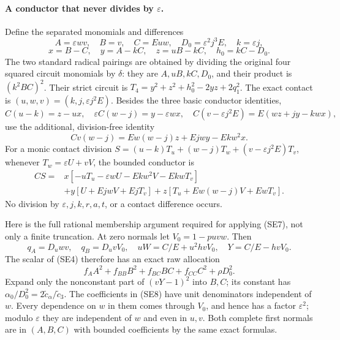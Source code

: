 \paragraph{A conductor that never divides by $\varepsilon$.}
Define the separated monomials and differences
\[
 A=\varepsilon wv,\quad B=v,\quad C=Euw,\quad
 D_0=\varepsilon^2j^3E,\quad k=\varepsilon j,
\]
\[
 x=B-C,\quad y=A-kC,\quad z=uB-kC,\quad h_0=kC-D_0.
\]
The two standard radical pairings are obtained by dividing the original
four squared circuit monomials by $\delta$: they are
$A,uB,kC,D_0$, and their product is $(k^2BC)^2$.
Their strict circuit is
$T_4=y^2+z^2+h_0^2-2yz+2q_1^2$.
The exact contact is $(u,w,v)=(k,j,\varepsilon j^2E)$.
Besides the three basic conductor identities,
\[
 C(u-k)=z-ux,\quad
 \varepsilon C(w-j)=y-\varepsilon wx,\quad
 C(v-\varepsilon j^2E)=E(wz+jy-kwx),                \tag{SE5}
\]
use the additional, division-free identity
\[
 C v(w-j)=Ew(w-j)z+Ejw y-Ekw^2x.                    \tag{SE6}
\]
For a monic contact division
$S=(u-k)T_u+(w-j)T_w+(v-\varepsilon j^2E)T_v$,
whenever $T_w=\varepsilon U+vV$, the bounded conductor is
\[
 \begin{aligned}
 CS={}&x[-uT_u-\varepsilon wU-Ekw^2V-EkwT_v]\\
 &+y[U+EjwV+EjT_v]
 +z[T_u+Ew(w-j)V+EwT_v].
 \end{aligned}                                      \tag{SE7}
\]
No division by $\varepsilon,j,k,r,a,t$, or a contact difference occurs.

Here is the full rational membership argument required for applying
(SE7), not only a finite truncation. At zero normals let
$V_0=1-puv w$. Then
\[
 q_A=D_u wv,\quad q_B=D_uvV_0,\quad
 uW=C/E+u^2hvV_0,\quad Y=C/E-hvV_0.
\]
The scalar of (SE4) therefore has an exact raw allocation
\[
 f_AA^2+f_{BB}B^2+f_{BC}BC+f_{CC}C^2+\rho D_0^2.     \tag{SE8}
\]
Expand only the nonconstant part of $(vY-1)^2$ into $B,C$; its constant
has $\alpha_0/D_0^2=2\widetilde c_\alpha/\widetilde c_3$.
The coefficients in (SE8) have unit denominators independent of $w$.
Every dependence on $w$ in them comes through $V_0$, and hence has a
factor $\varepsilon^2$; modulo $\varepsilon$ they are independent of
$w$ and even in $u,v$. Both complete first normals are in $(A,B,C)$
with bounded coefficients by the same exact formulas.

